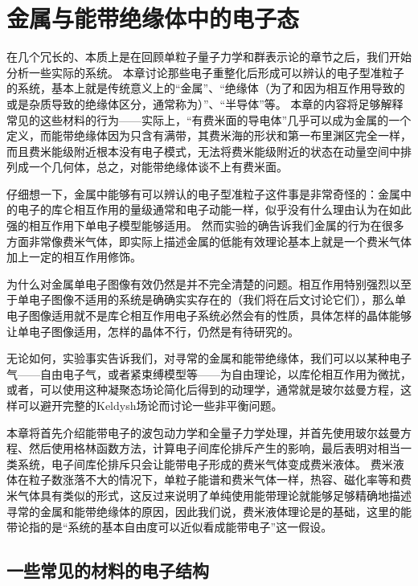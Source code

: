 \chapter{金属与能带绝缘体中的电子态}\label{chap:conventional-metal}

在几个冗长的、本质上是在回顾单粒子量子力学和群表示论的章节之后，我们开始分析一些实际的系统。
本章讨论那些电子重整化后形成可以辨认的电子型准粒子的系统，基本上就是传统意义上的“金属”、“绝缘体（为了和因为相互作用导致的或是杂质导致的绝缘体区分，通常称为）”、“半导体”等。
本章的内容将足够解释常见的这些材料的行为——实际上，“有费米面的导电体”几乎可以成为金属的一个定义，而能带绝缘体因为只含有满带，其费米海的形状和第一布里渊区完全一样，而且费米能级附近根本没有电子模式，无法将费米能级附近的状态在动量空间中排列成一个几何体，总之，对能带绝缘体谈不上有费米面。

仔细想一下，金属中能够有可以辨认的电子型准粒子这件事是非常奇怪的：金属中的电子的库仑相互作用的量级通常和电子动能一样，似乎没有什么理由认为在如此强的相互作用下单电子模型能够适用。
然而实验的确告诉我们金属的行为在很多方面非常像费米气体，即实际上描述金属的低能有效理论基本上就是一个费米气体加上一定的相互作用修饰。

为什么对金属单电子图像有效仍然是并不完全清楚的问题。相互作用特别强烈以至于单电子图像不适用的系统是确确实实存在的（我们将在后文讨论它们），那么单电子图像适用就不是库仑相互作用电子系统必然会有的性质，具体怎样的晶体能够让单电子图像适用，怎样的晶体不行，仍然是有待研究的。

无论如何，实验事实告诉我们，对寻常的金属和能带绝缘体，我们可以以某种电子气——自由电子气，或者紧束缚模型等——为自由理论，以库伦相互作用为微扰，或者，可以使用这种凝聚态场论简化后得到的动理学，通常就是玻尔兹曼方程，这样可以避开完整的Keldysh场论而讨论一些非平衡问题。

本章将首先介绍能带电子的波包动力学和全量子力学处理，并首先使用玻尔兹曼方程、然后使用格林函数方法，计算电子间库伦排斥产生的影响，最后表明对相当一类系统，电子间库伦排斥只会让能带电子形成的费米气体变成费米液体。
费米液体在粒子数涨落不大的情况下，单粒子能谱和费米气体一样，热容、磁化率等和费米气体具有类似的形式，这反过来说明了单纯使用能带理论就能够足够精确地描述寻常的金属和能带绝缘体的原因，因此我们说，费米液体理论是的基础，这里的能带论指的是“系统的基本自由度可以近似看成能带电子”这一假设。


\section{一些常见的材料的电子结构}

